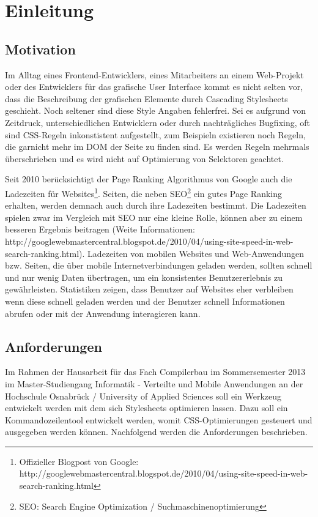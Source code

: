 \section{Einleitung}

\subsection{Motivation}
Im Alltag eines Frontend-Entwicklers, eines Mitarbeiters an einem Web-Projekt oder des Entwicklers für das grafische User Interface kommt es nicht selten vor, dass die Beschreibung der grafischen Elemente durch Cascading Stylesheets geschieht. Noch seltener sind diese Style Angaben fehlerfrei. Sei es aufgrund von Zeitdruck, unterschiedlichen Entwicklern oder durch nachträgliches Bugfixing, oft sind CSS-Regeln inkonstistent aufgestellt, zum Beispieln existieren noch Regeln, die garnicht mehr im DOM der Seite zu finden sind. Es werden Regeln mehrmals überschrieben und es wird nicht auf Optimierung von Selektoren geachtet. 

Seit 2010 berücksichtigt der Page Ranking Algorithmus von Google auch die Ladezeiten für Websites\footnote{Offizieller Blogpost von Google: http://googlewebmastercentral.blogspot.de/2010/04/using-site-speed-in-web-search-ranking.html}. Seiten, die neben SEO\footnote{SEO: Search Engine Optimization / Suchmaschinenoptimierung} ein gutes Page Ranking erhalten, werden demnach auch durch ihre Ladezeiten bestimmt. Die Ladezeiten spielen zwar im Vergleich mit SEO nur eine kleine Rolle, können aber zu einem besseren Ergebnis beitragen (Weite Informationen: http://googlewebmastercentral.blogspot.de/2010/04/using-site-speed-in-web-search-ranking.html).
Ladezeiten von mobilen Websites und Web-Anwendungen bzw. Seiten, die über mobile Internetverbindungen geladen werden, sollten schnell und nur wenig Daten übertragen, um ein konsistentes Benutzererlebnis zu gewährleisten. Statistiken zeigen, dass Benutzer auf Websites eher verbleiben wenn diese schnell geladen werden und der Benutzer schnell Informationen abrufen oder mit der Anwendung interagieren kann.

\subsection{Anforderungen}

Im Rahmen der Hausarbeit für das Fach Compilerbau im Sommersemester 2013 im Master-Studiengang Informatik - Verteilte und Mobile Anwendungen an der Hochschule Osnabrück / University of Applied Sciences soll ein Werkzeug entwickelt werden mit dem sich Stylesheets optimieren lassen. Dazu soll ein Kommandozeilentool entwickelt werden, womit CSS-Optimierungen gesteuert und ausgegeben werden können. Nachfolgend werden die Anforderungen beschrieben.

